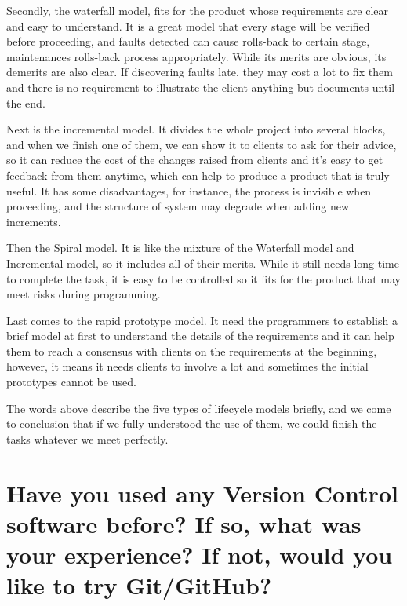 \documentclass{article}
\begin{document}
Secondly, the waterfall model, fits for the product whose requirements are clear and easy to understand. It is a great model that every stage will be verified before proceeding, and faults detected can cause rolls-back to certain stage, maintenances rolls-back process appropriately. While its merits are obvious, its demerits are also clear. If discovering faults late, they may cost a lot to fix them and there is no requirement to illustrate the client anything but documents until the end.

Next is the incremental model. It divides the whole project into several blocks, and when we finish one of them, we can show it to clients to ask for their advice, so it can reduce the cost of the changes raised from clients and it’s easy to get feedback from them anytime, which can help to produce a product that is truly useful. It has some disadvantages, for instance, the process is invisible when proceeding, and the structure of system may degrade when adding new increments.

Then the Spiral model. It is like the mixture of the Waterfall model and Incremental model, so it includes all of their merits. While it still needs long time to complete the task, it is easy to be controlled so it fits for the product that may meet risks during programming.

Last comes to the rapid prototype model. It need the programmers to establish a brief model at first to understand the details of the requirements and it can help them to reach a consensus with clients on the requirements at the beginning, however, it means it needs clients to involve a lot and sometimes the initial prototypes cannot be used.

The words above describe the five types of lifecycle models briefly, and we come to conclusion that if we fully understood the use of them, we could finish the tasks whatever we meet perfectly.



\section{Have you used any Version Control software before? If so, what
 was your experience? If not, would you like to try Git/GitHub?}
\end{document}
